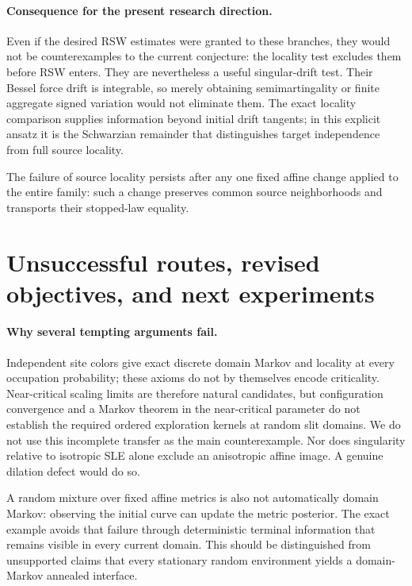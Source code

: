 \documentclass[11pt]{article}
\theoremstyle{definition}\newtheorem{definition}[theorem]{Definition}
\theoremstyle{remark}\newtheorem{remark}[theorem]{Remark}
\begin{document}
\paragraph{Consequence for the present research direction.}
Even if the desired RSW estimates were granted to these branches, they
would not be counterexamples to the current conjecture: the locality
test excludes them before RSW enters. They are nevertheless a useful
singular-drift test. Their Bessel force drift is integrable, so merely
obtaining semimartingality or finite aggregate signed variation would
not eliminate them. The exact locality comparison supplies information
beyond initial drift tangents; in this explicit ansatz it is the
Schwarzian remainder that distinguishes target independence from full
source locality.

The failure of source locality persists after any one fixed affine
change applied to the entire family: such a change preserves common
source neighborhoods and transports their stopped-law equality.


\section{Unsuccessful routes, revised objectives, and next experiments}
\label{sec:next}

\paragraph{Why several tempting arguments fail.}
Independent site colors give exact discrete domain Markov and locality at
every occupation probability; these axioms do not by themselves encode
criticality. Near-critical scaling limits are therefore natural candidates,
but configuration convergence and a Markov theorem in the near-critical
parameter do not establish the required ordered exploration kernels at
random slit domains. We do not use this incomplete transfer as the main
counterexample. Nor does singularity relative to isotropic SLE alone exclude
an anisotropic affine image. A genuine dilation defect would do so.

A random mixture over fixed affine metrics is also not automatically domain
Markov: observing the initial curve can update the metric posterior. The
exact example avoids that failure through deterministic terminal information
that remains visible in every current domain. This should be distinguished
from unsupported claims that every stationary random environment yields a
domain-Markov annealed interface.
\end{document}
